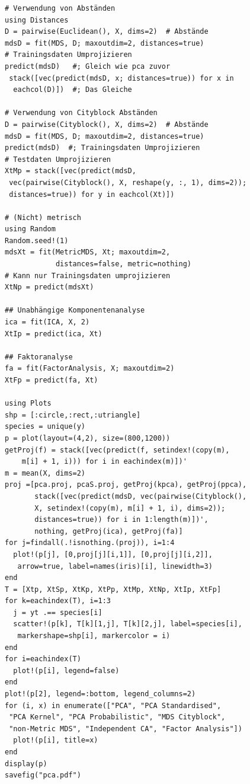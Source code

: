 \documentclass[10pt,twocolumn]{scrartcl}
\begin{document}
\begin{lstlisting}
# Verwendung von Abständen
using Distances
D = pairwise(Euclidean(), X, dims=2)  # Abstände
mdsD = fit(MDS, D; maxoutdim=2, distances=true)
# Trainingsdaten Umprojizieren
predict(mdsD)   #; Gleich wie pca zuvor
 stack([vec(predict(mdsD, x; distances=true)) for x in
  eachcol(D)])  #; Das Gleiche

# Verwendung von Cityblock Abständen
D = pairwise(Cityblock(), X, dims=2)  # Abstände
mdsD = fit(MDS, D; maxoutdim=2, distances=true)
predict(mdsD)  #; Trainingsdaten Umprojizieren
# Testdaten Umprojizieren
XtMp = stack([vec(predict(mdsD,
 vec(pairwise(Cityblock(), X, reshape(y, :, 1), dims=2));
 distances=true)) for y in eachcol(Xt)])

# (Nicht) metrisch
using Random
Random.seed!(1)
mdsXt = fit(MetricMDS, Xt; maxoutdim=2,
            distances=false, metric=nothing)
# Kann nur Trainingsdaten umprojizieren
XtNp = predict(mdsXt)

## Unabhängige Komponentenanalyse
ica = fit(ICA, X, 2)
XtIp = predict(ica, Xt)

## Faktoranalyse
fa = fit(FactorAnalysis, X; maxoutdim=2)
XtFp = predict(fa, Xt)

using Plots
shp = [:circle,:rect,:utriangle]
species = unique(y)
p = plot(layout=(4,2), size=(800,1200))
getProj(f) = stack([vec(predict(f, setindex!(copy(m),
    m[i] + 1, i))) for i in eachindex(m)])'
m = mean(X, dims=2)
proj =[pca.proj, pcaS.proj, getProj(kpca), getProj(ppca),
       stack([vec(predict(mdsD, vec(pairwise(Cityblock(),
       X, setindex!(copy(m), m[i] + 1, i), dims=2));
       distances=true)) for i in 1:length(m)])',
       nothing, getProj(ica), getProj(fa)]
for j=findall(.!isnothing.(proj)), i=1:4
  plot!(p[j], [0,proj[j][i,1]], [0,proj[j][i,2]],
   arrow=true, label=names(iris)[i], linewidth=3)
end
T = [Xtp, XtSp, XtKp, XtPp, XtMp, XtNp, XtIp, XtFp]
for k=eachindex(T), i=1:3
  j = yt .== species[i]
  scatter!(p[k], T[k][1,j], T[k][2,j], label=species[i],
   markershape=shp[i], markercolor = i)
end
for i=eachindex(T)
  plot!(p[i], legend=false)
end
plot!(p[2], legend=:bottom, legend_columns=2)
for (i, x) in enumerate(["PCA", "PCA Standardised",
 "PCA Kernel", "PCA Probabilistic", "MDS Cityblock",
 "non-Metric MDS", "Independent CA", "Factor Analysis"])
  plot!(p[i], title=x)
end
display(p)
savefig("pca.pdf")
\end{lstlisting}
\end{document}

